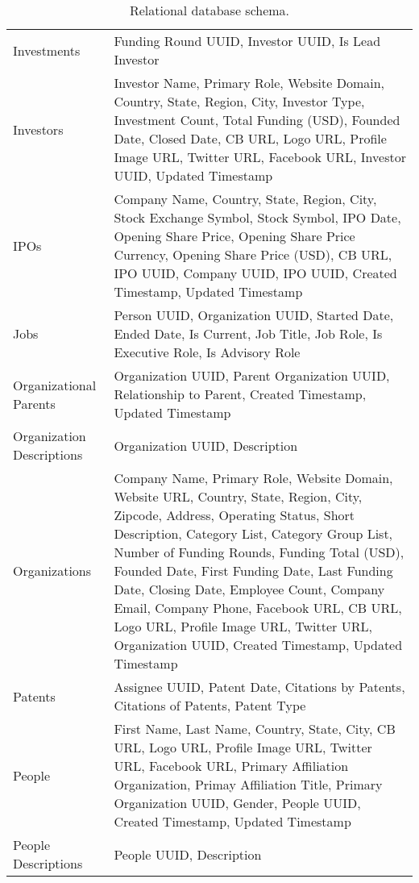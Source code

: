 \begin{table}[!htb]
{\begin{tabular}{p{3cm}p{10cm}}
Investments & Funding Round UUID, Investor UUID, Is Lead Investor \\
Investors & Investor Name, Primary Role, Website Domain, Country, State, Region, City, Investor Type, Investment Count, Total Funding (USD), Founded Date, Closed Date, CB URL, Logo URL, Profile Image URL, Twitter URL, Facebook URL, Investor UUID, Updated Timestamp\\
IPOs & Company Name, Country, State, Region, City, Stock Exchange Symbol, Stock Symbol, IPO Date, Opening Share Price, Opening Share Price Currency, Opening Share Price (USD), CB URL, IPO UUID, Company UUID, IPO UUID, Created Timestamp, Updated Timestamp \\
Jobs & Person UUID, Organization UUID, Started Date, Ended Date, Is Current, Job Title, Job Role, Is Executive Role, Is Advisory Role \\
Organizational Parents & Organization UUID, Parent Organization UUID, Relationship to Parent, Created Timestamp, Updated Timestamp \\
Organization Descriptions & Organization UUID, Description \\
Organizations & Company Name, Primary Role, Website Domain, Website URL, Country, State, Region, City, Zipcode, Address, Operating Status, Short Description, Category List, Category Group List, Number of Funding Rounds, Funding Total (USD), Founded Date, First Funding Date, Last Funding Date, Closing Date, Employee Count, Company Email, Company Phone, Facebook URL, CB URL, Logo URL, Profile Image URL, Twitter URL, Organization UUID, Created Timestamp, Updated Timestamp \\
Patents & Assignee UUID, Patent Date, Citations by Patents, Citations of Patents, Patent Type \\
People & First Name, Last Name, Country, State, City, CB URL, Logo URL, Profile Image URL, Twitter URL, Facebook URL, Primary Affiliation Organization, Primay Affiliation Title, Primary Organization UUID, Gender, People UUID, Created Timestamp, Updated Timestamp \\
People Descriptions & People UUID, Description \\
\bottomrule \end{tabular}
    }
    \caption[Relational database schema]{Relational database schema.}
    \label{tab:design:descriptive_statistics}
\end{table}

